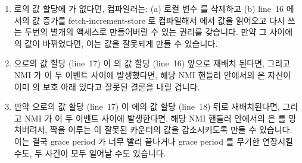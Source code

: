 \begin{enumerate}
\item	{} 로의 값 할당에  가 없다면, 컴파일러는: (a)
	로컬 변수  를 삭제하고 (b) line~16 에서의 값 증가를
	fetch-increment-store 로 컴파일해서  에서
	값을 읽어오고 다시 쓰는 두번의 별개의 액세스로 만들어버릴 수 있는
	권리를 갖습니다.
	만약 그 사이에  의 값이 바뀌었다면, 이는
	 값을 잘못되게 만들 수 있습니다.
\item	{} 으로의 값 할당 (line~17) 이 
	의 값 할당 (line~16) 앞으로 재배치 된다면, 그리고 NMI 가 이 두 이벤트
	사이에 발생했다면, 해당 NMI 핸들러 안에서의  은
	자신이 이미  의 보호 아래 있다고 잘못된 결론을 내릴
	겁니다.

\item	만약  으로의 값 할당 (line~17) 이
	 에의 값 할당 (line~18) 뒤로 재배치된다면, 그리고
	NMI 가 이 두 이벤트 사이에 발생한다면, 해당 NMI 핸들러 안에서의
	 은  를 망쳐버려서, 짝을 이루는
	 이 잘못된 카운터의 값을 감소시키도록 만들 수
	있습니다.
	이는 결국 grace period 가 너무 빨리 끝나거나 grace period 를 무기한
	연장시킬 수도, 두 사건이 모두 일어날 수도 있습니다.

\end{enumerate}

